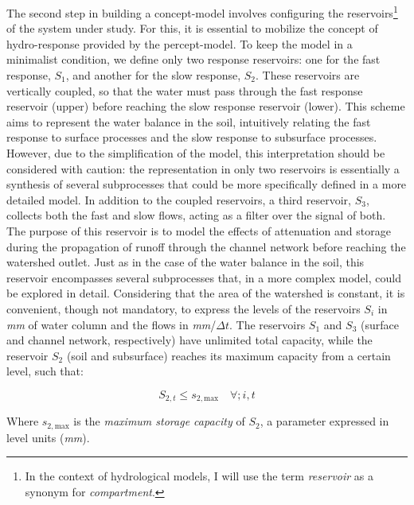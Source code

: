 \documentclass[./main_en.tex]{subfiles}
\begin{document}
\par The second step in building a \gls{concept-model} involves configuring the reservoirs\footnote{In the context of hydrological models, I will use the term \textit{reservoir} as a synonym for \textit{compartment}.} of the \gls{system} under study. For this, it is essential to mobilize the concept of \gls{hydro-response} provided by the \gls{percept-model}. To keep the \gls{model} in a minimalist condition, we define only two response reservoirs: one for the fast response, $S_1$, and another for the slow response, $S_2$. These reservoirs are vertically coupled, so that the water must pass through the fast response reservoir (upper) before reaching the slow response reservoir (lower). This scheme aims to represent the water balance in the soil, intuitively relating the fast response to surface processes and the slow response to subsurface processes. However, due to the simplification of the \gls{model}, this interpretation should be considered with caution: the representation in only two reservoirs is essentially a synthesis of several subprocesses that could be more specifically defined in a more detailed \gls{model}. In addition to the coupled reservoirs, a third reservoir, $S_3$, collects both the fast and slow flows, acting as a filter over the signal of both. The purpose of this reservoir is to model the effects of attenuation and storage during the propagation of runoff through the channel network before reaching the watershed outlet. Just as in the case of the water balance in the soil, this reservoir encompasses several subprocesses that, in a more complex \gls{model}, could be explored in detail. Considering that the area of the watershed is constant, it is convenient, though not mandatory, to express the levels of the reservoirs $S_i$ in \textit{mm} of water column and the flows in \textit{mm}/$\Delta t$. The reservoirs $S_1$ and $S_3$ (surface and channel network, respectively) have unlimited total capacity, while the reservoir $S_2$ (soil and subsurface) reaches its maximum capacity from a certain level, such that:
\begin{linenomath*}
\begin{equation}
\label{eq:max_capacity}
S_{2, t} \leq s_{2,\text{max}} \quad \forall ; i, t
\end{equation}
\end{linenomath*}
Where $s_{2, \text{max}}$ is the \textit{maximum storage capacity} of $S_2$, a parameter expressed in level units (\textit{mm}).
\end{document}
